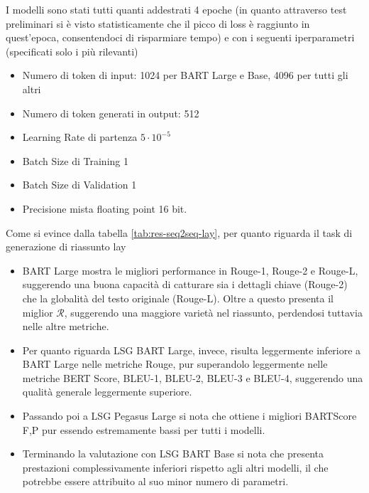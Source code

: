 \documentclass[12pt,a4paper,twoside,openright]{book}
\begin{document}
I modelli sono stati tutti quanti addestrati 4 epoche (in quanto attraverso test preliminari si è visto statisticamente che il picco di loss è raggiunto in quest'epoca, consentendoci di risparmiare tempo) e con i seguenti iperparametri (specificati solo i più rilevanti)
\begin{itemize}
    \item Numero di token di input: 1024 per BART Large e Base, 4096 per tutti gli altri 
    \item Numero di token generati in output: 512
    \item Learning Rate di partenza $5\cdot 10^{-5}$
    \item Batch Size di Training 1
    \item Batch Size di Validation 1
    \item Precisione mista floating point 16 bit.
\end{itemize}

Come si evince dalla tabella \ref{tab:res-seq2seq-lay}, per quanto riguarda il task di generazione di riassunto lay 
\begin{itemize}
    \item BART Large mostra le migliori performance in Rouge-1, Rouge-2 e Rouge-L, suggerendo una buona capacità di catturare sia i dettagli chiave (Rouge-2) che la globalità del testo originale (Rouge-L). Oltre a questo presenta il miglior $\mathcal{R}$, suggerendo una maggiore varietà nel riassunto, perdendosi tuttavia nelle altre metriche.
    \item Per quanto riguarda LSG BART Large, invece, risulta leggermente inferiore a BART Large nelle metriche Rouge, pur superandolo leggermente nelle metriche BERT Score, BLEU-1, BLEU-2, BLEU-3 e BLEU-4, suggerendo una qualità generale leggermente superiore.
    \item Passando poi a LSG Pegasus Large si nota che ottiene i migliori BARTScore F,P pur essendo estremamente bassi per tutti i modelli.
    \item Terminando la valutazione con LSG BART Base si nota che presenta prestazioni complessivamente inferiori rispetto agli altri modelli, il che potrebbe essere attribuito al suo minor numero di parametri.
\end{itemize} 
\end{document}

